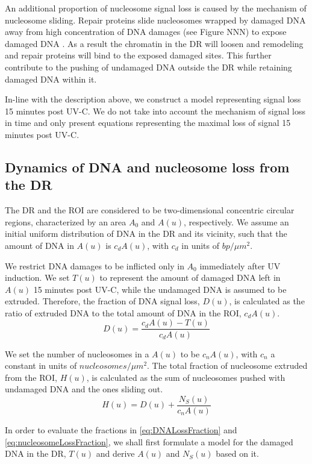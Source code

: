 \documentclass[12pt]{article}
\begin{document}
	An additional proportion of nucleosome signal loss is caused by the mechanism of nucleosome sliding. Repair proteins slide nucleosomes wrapped by damaged DNA away from high concentration of DNA damages (see Figure NNN) to expose damaged DNA \cite{gaillard2003chromatin}. As a result the chromatin in the DR will loosen and remodeling and repair proteins will bind to the exposed damaged sites. This further contribute to the pushing of undamaged DNA outside the DR while retaining damaged DNA within it.  

    In-line with the description above, we construct a model representing
	signal loss 15 minutes post UV-C. We do not take into account the
	mechanism of signal loss in time and only present equations representing the maximal loss of signal 15 minutes post UV-C.
	
	\subsection{Dynamics of DNA and nucleosome loss from the DR}
	The DR and the ROI are considered to be two-dimensional concentric circular regions, characterized by an area $A_0$ and $A(u)$, respectively. We assume an initial uniform distribution of DNA in the DR and its vicinity, such that the amount of DNA in $A(u)$ is $c_dA(u)$, with $c_d$ in units of $bp/\mu m^2$. 
	
	We restrict DNA damages to be inflicted only in $A_0$ immediately after UV induction. We set $T(u)$ to represent the amount of damaged DNA left in $A(u)$ 15 minutes post UV-C, while the undamaged DNA is assumed to be extruded. Therefore, the fraction of DNA signal loss, $D(u)$, is calculated as the ratio of extruded DNA to the total amount of DNA in the ROI, $c_dA(u)$. 
	\begin{equation}\label{eq:DNALossFraction}
	D(u) = \frac{c_dA(u)- T(u)}{c_dA(u)}
	\end{equation}
	
	We set the number of nucleosomes in a $A(u)$ to be $c_nA(u)$, with $c_n$ a constant in units of $nucleosomes/\mu m^2$. The total fraction of nucleosome extruded from the ROI, $H(u)$, is calculated as the sum of nucleosomes pushed with undamaged DNA and the ones sliding out.
	\begin{equation}\label{eq:nucleosomeLossFraction}
	H(u) = D(u) + \frac{N_S(u)}{c_nA(u)}	
	\end{equation}
	
	In order to evaluate the fractions in \eqref{eq:DNALossFraction} and \eqref{eq:nucleosomeLossFraction}, we shall first formulate a model for the damaged DNA in the DR, $T(u)$ and derive $A(u)$ and $N_S(u)$ based on it.
	
\end{document}

